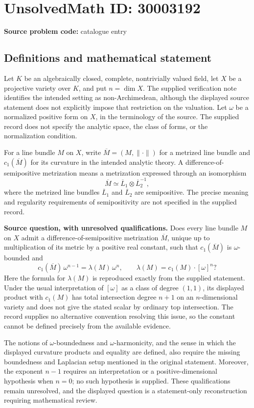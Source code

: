 \documentclass[11pt]{article}
\begin{document}
\section*{UnsolvedMath ID: 30003192}
\textbf{Source problem code:} catalogue entry
\subsection{Definitions and mathematical statement}
Let \(K\) be an algebraically closed, complete, nontrivially valued field, let \(X\) be a projective variety over \(K\), and put \(n=\dim X\). The supplied verification note identifies the intended setting as non-Archimedean, although the displayed source statement does not explicitly impose that restriction on the valuation. Let \(\omega\) be a normalized positive form on \(X\), in the terminology of the source. The supplied record does not specify the analytic space, the class of forms, or the normalization condition.

For a line bundle \(M\) on \(X\), write \(\overline M=(M,\|\cdot\|)\) for a metrized line bundle and \(c_1(\overline M)\) for its curvature in the intended analytic theory. A difference-of-semipositive metrization means a metrization expressed through an isomorphism
\[
\overline M\simeq\overline L_1\otimes\overline L_2^{-1},
\]
where the metrized line bundles \(\overline L_1\) and \(\overline L_2\) are semipositive. The precise meaning and regularity requirements of semipositivity are not specified in the supplied record.

\textbf{Source question, with unresolved qualifications.} Does every line bundle \(M\) on \(X\) admit a difference-of-semipositive metrization \(\overline M\), unique up to multiplication of its metric by a positive real constant, such that \(c_1(\overline M)\) is \(\omega\)-bounded and
\[
c_1(\overline M)\,\omega^{n-1}=\lambda(M)\,\omega^n,
\qquad
\lambda(M)=c_1(M)\cdot[\omega]^n?
\]
Here the formula for \(\lambda(M)\) is reproduced exactly from the supplied statement. Under the usual interpretation of \([\omega]\) as a class of degree \((1,1)\), its displayed product with \(c_1(M)\) has total intersection degree \(n+1\) on an \(n\)-dimensional variety and does not give the stated scalar by ordinary top intersection. The record supplies no alternative convention resolving this issue, so the constant cannot be defined precisely from the available evidence.

The notions of \(\omega\)-boundedness and \(\omega\)-harmonicity, and the sense in which the displayed curvature products and equality are defined, also require the missing boundedness and Laplacian setup mentioned in the original statement. Moreover, the exponent \(n-1\) requires an interpretation or a positive-dimensional hypothesis when \(n=0\); no such hypothesis is supplied. These qualifications remain unresolved, and the displayed question is a statement-only reconstruction requiring mathematical review.
\end{document}
